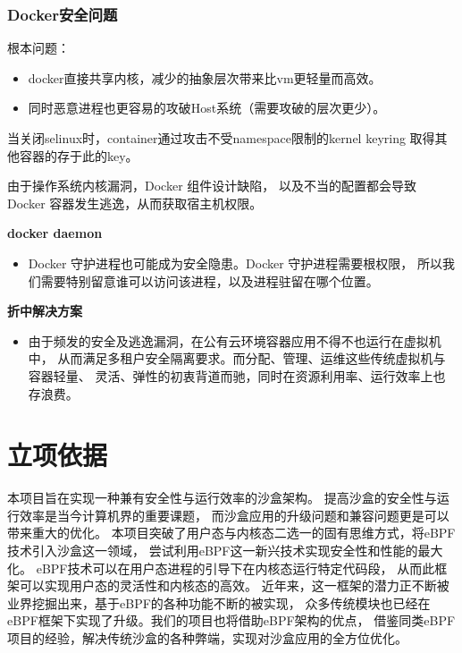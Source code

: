 \documentclass[AutoFakeBold,a4paper]{ctexart}
\begin{document}
\subsubsection{Docker安全问题}

根本问题\cite{merkel2014docker,combe2016docker,bui2015analysis,bernstein2014containers}：

\begin{itemize}
    \item docker直接共享内核，减少的抽象层次带来比vm更轻量而高效。
    \item 同时恶意进程也更容易的攻破Host系统（需要攻破的层次更少）。
\end{itemize}

当关闭selinux时，container通过攻击不受namespace限制的kernel keyring
取得其他容器的存于此的key。\cite{Dan2014}

由于操作系统内核漏洞，Docker 组件设计缺陷，
以及不当的配置都会导致 Docker 容器发生逃逸，从而获取宿主机权限。\cite{AWS2019}

\textbf{docker daemon}
\begin{itemize}
    \item Docker 守护进程也可能成为安全隐患。Docker 守护进程需要根权限，
    所以我们需要特别留意谁可以访问该进程，以及进程驻留在哪个位置。
\end{itemize}

\textbf{折中解决方案}
\begin{itemize}
    \item 由于频发的安全及逃逸漏洞，在公有云环境容器应用不得不也运行在虚拟机中，
    从而满足多租户安全隔离要求。而分配、管理、运维这些传统虚拟机与容器轻量、
    灵活、弹性的初衷背道而驰，同时在资源利用率、运行效率上也存浪费。
\end{itemize}

\section{立项依据}

本项目旨在实现一种兼有安全性与运行效率的沙盒架构。
提高沙盒的安全性与运行效率是当今计算机界的重要课题，
而沙盒应用的升级问题和兼容问题更是可以带来重大的优化。
本项目突破了用户态与内核态二选一的固有思维方式，将eBPF技术引入沙盒这一领域，
尝试利用eBPF这一新兴技术实现安全性和性能的最大化。
eBPF技术可以在用户态进程的引导下在内核态运行特定代码段，
从而此框架可以实现用户态的灵活性和内核态的高效。
近年来，这一框架的潜力正不断被业界挖掘出来，基于eBPF的各种功能不断的被实现，
众多传统模块也已经在eBPF框架下实现了升级。我们的项目也将借助eBPF架构的优点，
借鉴同类eBPF项目的经验，解决传统沙盒的各种弊端，实现对沙盒应用的全方位优化。
\end{document}
